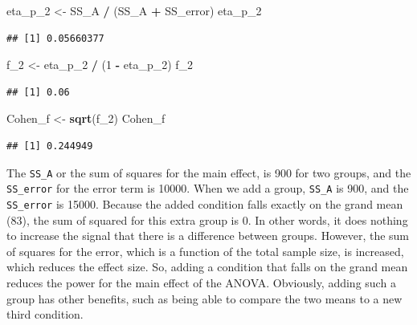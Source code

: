 \documentclass[]{book}
\newenvironment{Shaded}{\begin{snugshade}}{\end{snugshade}}
\newcommand{\DecValTok}[1]{\textcolor[rgb]{0.00,0.00,0.81}{#1}}
\newcommand{\KeywordTok}[1]{\textcolor[rgb]{0.13,0.29,0.53}{\textbf{#1}}}
\newcommand{\NormalTok}[1]{#1}
\newcommand{\OperatorTok}[1]{\textcolor[rgb]{0.81,0.36,0.00}{\textbf{#1}}}
\newcommand{\StringTok}[1]{\textcolor[rgb]{0.31,0.60,0.02}{#1}}
\begin{document}
\begin{Shaded}
\begin{Highlighting}[]
\NormalTok{eta_p_}\DecValTok{2}\NormalTok{ <-}\StringTok{ }\NormalTok{SS_A }\OperatorTok{/}\StringTok{ }\NormalTok{(SS_A }\OperatorTok{+}\StringTok{ }\NormalTok{SS_error)}
\NormalTok{eta_p_}\DecValTok{2}
\end{Highlighting}
\end{Shaded}

\begin{verbatim}
## [1] 0.05660377
\end{verbatim}

\begin{Shaded}
\begin{Highlighting}[]
\NormalTok{f_}\DecValTok{2}\NormalTok{ <-}\StringTok{ }\NormalTok{eta_p_}\DecValTok{2} \OperatorTok{/}\StringTok{ }\NormalTok{(}\DecValTok{1} \OperatorTok{-}\StringTok{ }\NormalTok{eta_p_}\DecValTok{2}\NormalTok{)}
\NormalTok{f_}\DecValTok{2}
\end{Highlighting}
\end{Shaded}

\begin{verbatim}
## [1] 0.06
\end{verbatim}

\begin{Shaded}
\begin{Highlighting}[]
\NormalTok{Cohen_f <-}\StringTok{ }\KeywordTok{sqrt}\NormalTok{(f_}\DecValTok{2}\NormalTok{)}
\NormalTok{Cohen_f}
\end{Highlighting}
\end{Shaded}

\begin{verbatim}
## [1] 0.244949
\end{verbatim}

The \texttt{SS\_A} or the sum of squares for the main effect, is 900 for two groups, and the \texttt{SS\_error} for the error term is 10000. When we add a group, \texttt{SS\_A} is 900, and the \texttt{SS\_error} is 15000. Because the added condition falls exactly on the grand mean (83), the sum of squared for this extra group is 0. In other words, it does nothing to increase the signal that there is a difference between groups. However, the sum of squares for the error, which is a function of the total sample size, is increased, which reduces the effect size. So, adding a condition that falls on the grand mean reduces the power for the main effect of the ANOVA. Obviously, adding such a group has other benefits, such as being able to compare the two means to a new third condition.
\end{document}
